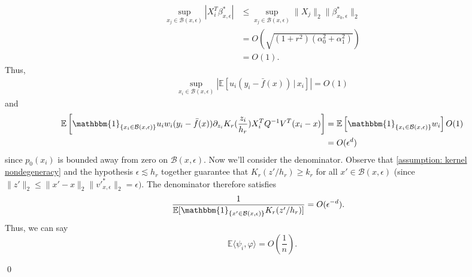 \documentclass[11pt]{article}
\begin{document}
\begin{align}
     \sup_{x_j \in \mathcal{B}(x, \epsilon)} \left| X_i^T\beta_{x, \epsilon}^*\right| &\leq \sup_{x_j \in \mathcal{B}(x, \epsilon)}\|X_j\|_2\|\beta^*_{x_0, \epsilon}\|_2\\
    &= O\left(\sqrt{(1 + r^2)(\alpha_0^2 + \alpha_1^2)}\right) \\
    &= O(1).
\end{align}
Thus,
\begin{align}
    \sup_{x_i \in \mathcal{B}(x, \epsilon)} \left|\mathbb{E}[u_i(y_i - \bar{f}(x))\,| \,x_i]\right| = O(1)
\end{align}
and 
\begin{align}
    \mathbb{E}\left[ \mathbbm{1}_{\{x_i \in \mathcal{B}(x, \epsilon)\}}u_iw_i(y_i - \bar{f}(x))\partial_{z_i}K_r(\frac{z_i}{h_r})X_i^TQ^{-1}V^T(x_i - x)\right] &= \mathbb{E}\left[ \mathbbm{1}_{\{x_i \in \mathcal{B}(x, \epsilon)\}}w_i\right]O(1) \\
    &= O(\epsilon^d)
\end{align}
since $p_0(x_i)$ is bounded away from zero on $\mathcal{B}(x, \epsilon).$ Now we'll consider the denominator. Observe that \cref{assumption: kernel nondegeneracy} and the hypothesis $\epsilon \lesssim h_r$ together guarantee that $K_r(z'/h_r) \geq k_r$ for all $x' \in \mathcal{B}(x, \epsilon)$ (since $\|z'\|_2 \leq \|x' -x\|_2\|v'^*_{x, \epsilon}\|_2 = \epsilon).$ The denominator therefore satisfies 
\begin{align}
    \frac{1}{\mathbb{E}[\mathbbm{1}_{\{x' \in \mathcal{B}(x, \epsilon)\}}K_r(z'/h_r)]} &= O(\epsilon^{-d}).
\end{align}
Thus, we can say 
\[\mathbb{E}\langle \psi_i, \varphi\rangle = O\left(\frac{1}{n}\right).\]

\qed{}
\end{document}
